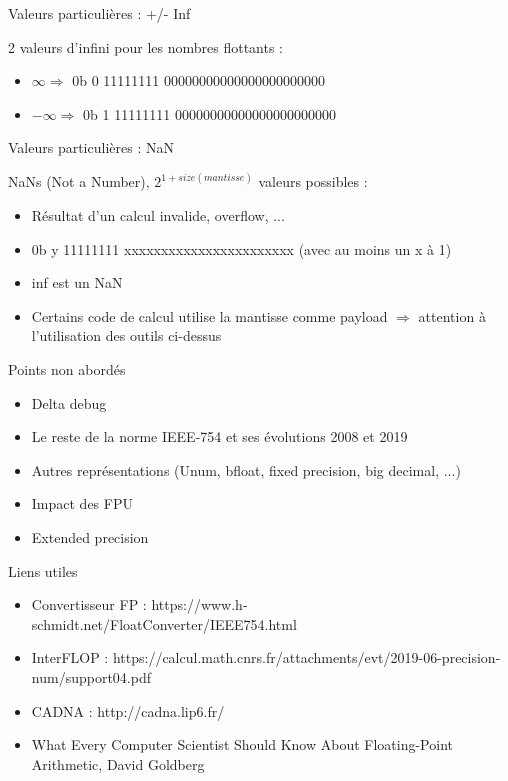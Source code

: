 \documentclass{beamer}
\begin{document}
  \begin{frame}{Valeurs particulières : +/- Inf}
      \begin{large}
  2 valeurs d'infini pour les nombres flottants :
  \begin{itemize}
  \item $\infty \Rightarrow$ 0b \textcolor{SignColor}{0} \textcolor{ExponentColor}{11111111} \textcolor{FractionColor}{00000000000000000000000} \\
    \item $-\infty \Rightarrow$ 0b \textcolor{SignColor}{1} \textcolor{ExponentColor}{11111111} \textcolor{FractionColor}{00000000000000000000000} \\
  \end{itemize}
        \end{large}
  \end{frame}
  
  \begin{frame}{Valeurs particulières : NaN}
      \begin{large}
  NaNs (Not a Number), $2^{1+size(mantisse)}$ valeurs possibles :
  \begin{itemize}
  \item Résultat d'un calcul invalide, overflow, ...
  \item 0b \textcolor{SignColor}{y} \textcolor{ExponentColor}{11111111} \textcolor{FractionColor}{xxxxxxxxxxxxxxxxxxxxxxx} (avec au moins un x à 1)\\
  \item inf est un NaN
  \item Certains code de calcul utilise la mantisse comme payload $\Rightarrow$ attention à l'utilisation des outils ci-dessus
  \end{itemize}
        \end{large}
  \end{frame}

  \begin{frame}{Points non abordés}
  \begin{itemize}
  \item Delta debug
  \item Le reste de la norme IEEE-754 et ses évolutions 2008 et 2019
  \item Autres représentations (Unum, bfloat, fixed precision, big decimal, ...)
  \item Impact des FPU
  \item Extended precision
  \end{itemize}
  \end{frame}

  \begin{frame}{Liens utiles}
  \begin{itemize}
  \item Convertisseur FP : https://www.h-schmidt.net/FloatConverter/IEEE754.html
  \item InterFLOP : https://calcul.math.cnrs.fr/attachments/evt/2019-06-precision-num/support04.pdf
  \item CADNA : http://cadna.lip6.fr/
  \item What Every Computer Scientist Should Know About Floating-Point Arithmetic, David Goldberg
  \end{itemize}
  \end{frame}
\end{document}
